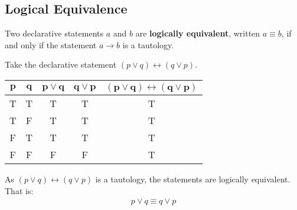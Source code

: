 \documentclass[../notes.tex]{subfiles}
\begin{document}
			\subsection{Logical Equivalence}
				Two declarative statements $a$ and $b$ are \textbf{logically equivalent}, written $a \equiv b$, if and only if the statement $a \rightarrow b$ is a tautology.
				\begin{examplebox}
					Take the declarative statement $(p \lor q) \leftrightarrow (q \lor p)$.
					\begin{center}
						\begin{tabular}{| c c | c | c | c |}
							\hline
							$\mathbf{p}$ & $\mathbf{q}$ & $\mathbf{p \lor q}$ & $\mathbf{q \lor p}$ & $\mathbf{(p \lor q) \leftrightarrow (q \lor p)}$\\
							\hline
							T & T & T & T & T \\
							T & F & T & T & T \\
							F & T & T & T & T \\
							F & F & F & F & T \\
							\hline
						\end{tabular}
					\end{center}
					As $(p \lor q) \leftrightarrow (q \lor p)$ is a tautology, the statements are logically equivalent. That is:
						\begin{align*}
							p \lor q \equiv q \lor p
						\end{align*}
				\end{examplebox}
			\pagebreak
\end{document}
